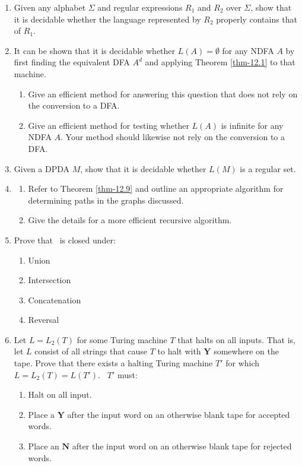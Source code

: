 \begin{enumerate}[{12.}1.]
\item Given any alphabet $\Sigma$ and regular expressions $R_1$ and $R_2$ over
$\Sigma$, show that it is decidable whether the language represented by $R_2$
properly contains that of $R_1$.

\item It can be shown that it is decidable whether $L(A)=\emptyset$ for any NDFA
$A$ by first finding the equivalent DFA $A^d$ and applying Theorem
\ref{thm-12.1} to that machine.
\begin{enumerate}
\item Give an efficient method for answering this question that does not rely on
the conversion to a DFA.
\item Give an efficient method for testing whether $L(A)$ is infinite for any
NDFA $A$. Your method should likewise not rely on the conversion to a DFA.
\end{enumerate}

\item Given a DPDA $M$, show that it is decidable whether $L(M)$ is a regular
set.

\item \begin{enumerate}
\item Refer to Theorem \ref{thm-12.9} and outline an appropriate algorithm for
determining paths in the graphs discussed.
\item Give the details for a more efficient recursive algorithm.
\end{enumerate}

\item Prove that \HSIG\ is closed under:
\begin{enumerate}
\item Union
\item Intersection
\item Concatenation
\item Reversal
\end{enumerate}

\item Let $L=L_2(T)$ for some Turing machine $T$ that halts on all inputs. That
is, let $L$ consist of all strings that cause $T$ to halt with $\pmb{Y}$
somewhere on the tape. Prove that there exists a halting Turing machine $T'$ for
which $L=L_2(T)=L(T')$. \  $T'$ must:
\begin{enumerate}[1.]
\item Halt on all input.
\item Place a $\pmb{Y}$ after the input word on an otherwise blank tape for
accepted words.
\item Place an $\pmb{N}$ after the input word on an otherwise blank tape for
rejected words.
\end{enumerate}


\end{enumerate}
